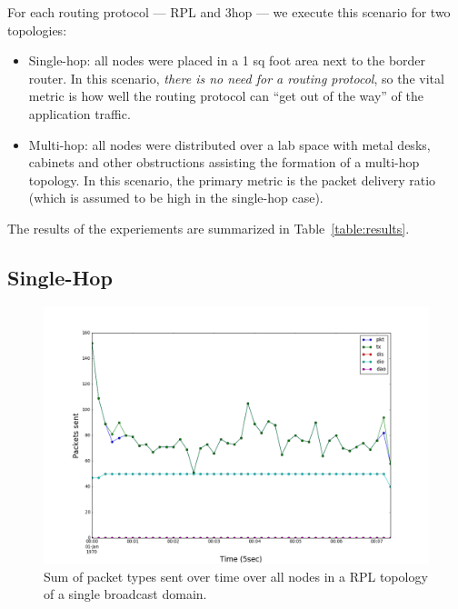 For each routing protocol --- RPL and 3hop --- we execute this scenario for two topologies:
\begin{itemize}
\item Single-hop: all nodes were placed in a 1 sq foot area next to the border router.
In this scenario, \emph{there is no need for a routing protocol}, so the vital metric is how well the routing protocol can ``get out of the way'' of the application traffic.
\item Multi-hop: all nodes were distributed over a  lab space with metal desks, cabinets and other obstructions assisting the formation of a multi-hop topology.
In this scenario, the primary metric is the packet delivery ratio (which is assumed to be high in the single-hop case).
\end{itemize}

The results of the experiements are summarized in Table~\ref{table:results}.

\subsection{Single-Hop}

\begin{figure}[t]
\centering
\includegraphics[width=\linewidth]{figs/rpl_single_hop.png}
\caption{Sum of packet types sent over time over all nodes in a RPL topology of a single broadcast domain.}
\label{fig:rpl_single_hop}
\end{figure}

